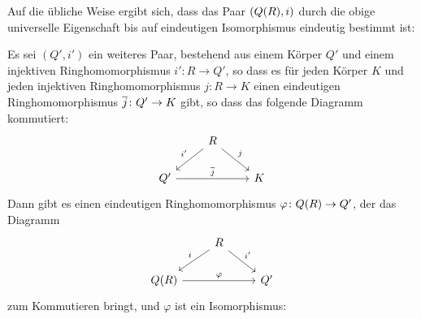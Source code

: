 \begin{remark}
  Auf die übliche Weise ergibt sich, dass das Paar $(Q(R), i)$ durch die obige universelle Eigenschaft bis auf eindeutigen Isomorphismus eindeutig bestimmt ist:
  
  Es sei $(Q', i')$ ein weiteres Paar, bestehend aus einem Körper $Q'$ und einem injektiven Ringhomomorphismus $i' \colon R \to Q'$, so dass es für jeden Körper $K$ und jeden injektiven Ringhomomorphismus $j \colon R \to K$ einen eindeutigen Ringhomomorphismus $\overline{j} \colon Q' \to K$ gibt, so dass das folgende Diagramm kommutiert:
  \begin{equation}
    \begin{tikzcd}
        {}
      & R
        \arrow[swap]{dl}{i'}
        \arrow{dr}{j}
      & {}
      \\
        Q'
        \arrow{rr}{\induced{j}}
      & {}
      & K
    \end{tikzcd}
  \end{equation}
  Dann gibt es einen eindeutigen Ringhomomorphismus $\varphi \colon Q(R) \to Q'$, der das Diagramm
  \begin{equation}
    \label{equation: first morphism from uniqueness}
    \begin{tikzcd}
        {}
      & R
        \arrow[swap]{dl}{i}
        \arrow{dr}{i'}
      & {}
      \\
        \fraction{R}
        \arrow{rr}{\varphi}
      & {}
      & Q'
    \end{tikzcd}
  \end{equation}
  zum Kommutieren bringt, und $\varphi$ ist ein Isomorphismus:
  

\end{remark}
